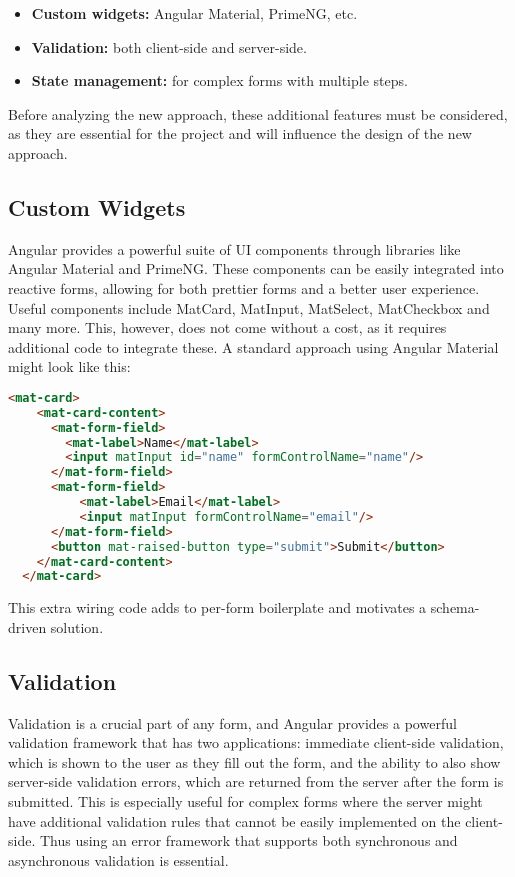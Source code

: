 \begin{itemize}
  \item \textbf{Custom widgets:} Angular Material, PrimeNG, etc.
  \item \textbf{Validation:} both client-side and server-side.
  \item \textbf{State management:} for complex forms with multiple steps.
\end{itemize}

Before analyzing the new approach, these additional features must be considered, as they are essential for the
project and will influence the design of the new approach.

\subsection{Custom Widgets}

Angular provides a powerful suite of UI components through libraries like Angular Material and PrimeNG\@.
These components can be easily integrated into reactive forms, allowing for both prettier forms and a better user
experience.
Useful components include MatCard, MatInput, MatSelect, MatCheckbox and many more.
This, however, does not come without a cost, as it requires additional code to integrate these.
A standard approach using Angular Material might look like this:

\begin{lstlisting}[language=HTML,caption={Angular Material HTML}, label={lst:materialHTML}]
  <mat-card>
    <mat-card-content>
      <mat-form-field>
        <mat-label>Name</mat-label>
        <input matInput id="name" formControlName="name"/>
      </mat-form-field>
      <mat-form-field>
          <mat-label>Email</mat-label>
          <input matInput formControlName="email"/>
      </mat-form-field>
      <button mat-raised-button type="submit">Submit</button>
    </mat-card-content>
  </mat-card>
\end{lstlisting}

This extra wiring code adds to per-form boilerplate and motivates a schema-driven solution.

\subsection{Validation}

Validation is a crucial part of any form, and Angular provides a powerful validation framework that has two applications:
immediate client-side validation, which is shown to the user as they fill out the form, and the ability to also show
server-side validation errors, which are returned from the server after the form is submitted.
This is especially useful for complex forms where the server might have additional validation rules that cannot be easily
implemented on the client-side.
Thus using an error framework that supports both synchronous and asynchronous validation is essential.

